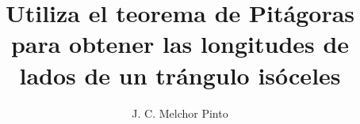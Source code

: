 \documentclass[12pt]{guia}
\title{Utiliza el teorema de Pitágoras para obtener las longitudes de lados de un trángulo isóceles}
\author{J. C. Melchor Pinto}
\begin{document}
\pagestyle{headandfoot}
\addpoints
\INFO
\printanswers

\newpage
\begin{questions}
    
    
    
    
    
    
    
\end{questions}
\end{document}
